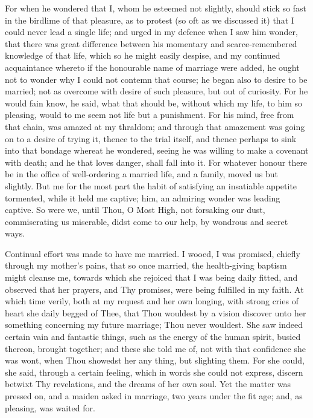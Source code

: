\documentclass[b5paper,openright,12pt,twoside]{book}
\begin{document}
For when he wondered that I, whom he esteemed not slightly, should stick
so fast in the birdlime of that pleasure, as to protest (so oft as we
discussed it) that I could never lead a single life; and urged in my
defence when I saw him wonder, that there was great difference between
his momentary and scarce-remembered knowledge of that life, which so
he might easily despise, and my continued acquaintance whereto if the
honourable name of marriage were added, he ought not to wonder why I
could not contemn that course; he began also to desire to be married;
not as overcome with desire of such pleasure, but out of curiosity. For
he would fain know, he said, what that should be, without which my life,
to him so pleasing, would to me seem not life but a punishment. For his
mind, free from that chain, was amazed at my thraldom; and through that
amazement was going on to a desire of trying it, thence to the trial
itself, and thence perhaps to sink into that bondage whereat he
wondered, seeing he was willing to make a covenant with death; and he
that loves danger, shall fall into it. For whatever honour there be in
the office of well-ordering a married life, and a family, moved us but
slightly. But me for the most part the habit of satisfying an insatiable
appetite tormented, while it held me captive; him, an admiring wonder
was leading captive. So were we, until Thou, O Most High, not forsaking
our dust, commiserating us miserable, didst come to our help, by
wondrous and secret ways.

Continual effort was made to have me married. I wooed, I was
promised, chiefly through my mother's pains, that so once married, the
health-giving baptism might cleanse me, towards which she rejoiced
that I was being daily fitted, and observed that her prayers, and Thy
promises, were being fulfilled in my faith. At which time verily, both
at my request and her own longing, with strong cries of heart she
daily begged of Thee, that Thou wouldest by a vision discover unto her
something concerning my future marriage; Thou never wouldest. She saw
indeed certain vain and fantastic things, such as the energy of the
human spirit, busied thereon, brought together; and these she told me
of, not with that confidence she was wont, when Thou showedst her any
thing, but slighting them. For she could, she said, through a certain
feeling, which in words she could not express, discern betwixt Thy
revelations, and the dreams of her own soul. Yet the matter was pressed
on, and a maiden asked in marriage, two years under the fit age; and, as
pleasing, was waited for.
\end{document}
